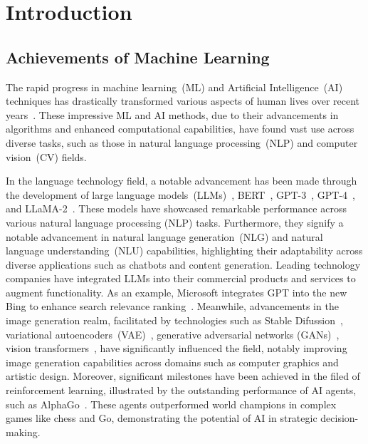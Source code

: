 \chapter{Introduction}\label{chap:intro}

\section{Achievements of Machine Learning} \label{sec:achiml}

The rapid progress in machine learning~(ML) and Artificial Intelligence~(AI) techniques
has drastically transformed various aspects of human lives over recent years~\cite{bengio-nature15,taward18}.
%
These impressive ML and AI methods, due to their advancements in algorithms
and enhanced computational capabilities,
have found vast use across
diverse tasks, such as those in natural language processing~(NLP) and computer vision~(CV) fields.



In the language technology field, a notable advancement has been made through the development
of large language models~(LLMs)~\cite{llm-tist23,gptedu-lid23,transformer-17}, BERT~\cite{dclt-bert19}, GPT-3~\cite{gpt-3-neurips20}, GPT-4~\cite{gpt-4-corr23}, and LLaMA-2~\cite{llama-2-corr23}.
%
These models have showcased remarkable performance across various natural language processing (NLP) tasks.
%
Furthermore, they signify a notable advancement in natural language generation~(NLG) 
and natural language understanding~(NLU) capabilities, 
highlighting their adaptability across diverse applications such as chatbots and content generation.
%
Leading technology companies have integrated LLMs into their commercial products 
and services to augment functionality.
%
As an example, Microsoft integrates GPT into the new Bing to enhance search relevance ranking~\cite{bing-17}.
%
Meanwhile, advancements in the image generation realm, facilitated by technologies 
such as Stable Difussion~\cite{rbleo-cvpr22}, variational autoencoders~(VAE)~\cite{kw-corr13}, generative adversarial networks (GANs)~\cite{gan-corr14},
vision transformers~\cite{vtransformer-21}, have significantly influenced the field,
notably improving image generation capabilities across domains such as computer graphics and artistic design.
%
Moreover, significant milestones have been achieved in the filed of reinforcement learning, 
illustrated by the outstanding performance of AI agents, such as AlphaGo~\cite{rl-nature15,rlchess-science18,rlgo-nature17}.
%
These agents outperformed world champions in complex games like chess and Go,
demonstrating the potential of AI in strategic decision-making.


